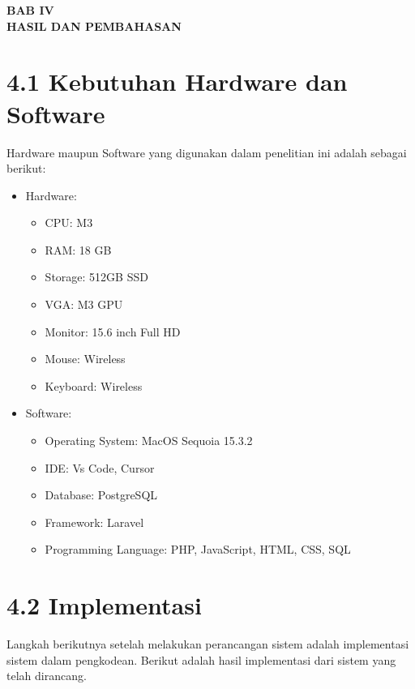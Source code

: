 \begin{center}
  \textbf{BAB IV} \\[0.5em]
  \textbf{HASIL DAN PEMBAHASAN}
\end{center}

\section*{4.1 Kebutuhan Hardware dan Software}
Hardware maupun Software yang digunakan dalam penelitian ini adalah sebagai berikut:

\begin{itemize}
  \item Hardware:
    \begin{itemize}
      \item CPU: M3
      \item RAM: 18 GB
      \item Storage: 512GB SSD
      \item VGA: M3 GPU
      \item Monitor: 15.6 inch Full HD
      \item Mouse: Wireless
      \item Keyboard: Wireless
    \end{itemize}
  \item Software:
    \begin{itemize}
      \item Operating System: MacOS Sequoia 15.3.2
      \item IDE: Vs Code, Cursor
      \item Database: PostgreSQL
      \item Framework: Laravel
      \item Programming Language: PHP, JavaScript, HTML, CSS, SQL
    \end{itemize}
\end{itemize}

\section*{4.2 Implementasi}

Langkah berikutnya setelah melakukan perancangan sistem adalah implementasi sistem dalam pengkodean. 
Berikut adalah hasil implementasi dari sistem yang telah dirancang.

